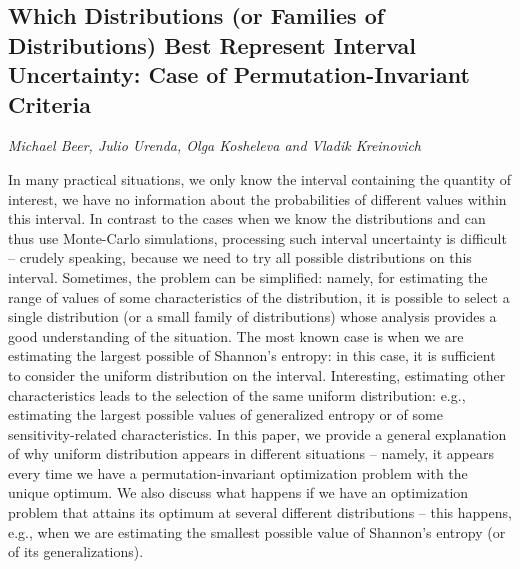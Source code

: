 \documentclass[../booklet.tex]{subfiles}
\begin{document}
\subsection[Which Distributions (or Families of Distributions) Best Represent Interval Uncertainty: Case of Permutation-Invariant Criteria. {\it Michael Beer, Julio Urenda, Olga Kosheleva and Vladik Kreinovich}]{Which Distributions (or Families of Distributions) Best Represent Interval Uncertainty: Case of Permutation-Invariant Criteria}
   

\begin{center}
  {\it Michael Beer, Julio Urenda, Olga Kosheleva and Vladik Kreinovich}
\end{center}



In many practical situations, we only know the interval containing
the quantity of interest, we have no information about the
probabilities of different values within this interval. In contrast
to the cases when we know the distributions and can thus use
Monte-Carlo simulations, processing such interval uncertainty is
difficult -- crudely speaking, because we need to try all possible
distributions on this interval. Sometimes, the problem can be
simplified: namely, for estimating the range of values of some characteristics of the distribution,
it is possible to select a single distribution
(or a small family of distributions) whose analysis provides a good
understanding of the situation. The most known case is when we are estimating the largest possible of Shannon's entropy: in this case, it is sufficient to consider the uniform distribution on
the interval. Interesting, estimating other characteristics leads to the selection of the same
uniform distribution: e.g., estimating the largest possible values of generalized entropy or of some sensitivity-related characteristics. 
In this paper, we provide a general
explanation of why uniform distribution appears in different
situations -- namely, it appears every time we have a
permutation-invariant optimization problem with the unique optimum.
We also discuss what happens if we have an optimization problem that attains its optimum at several 
different distributions -- this happens, e.g., when we are estimating the smallest possible 
value of Shannon's entropy (or of its generalizations).
\end{document}
